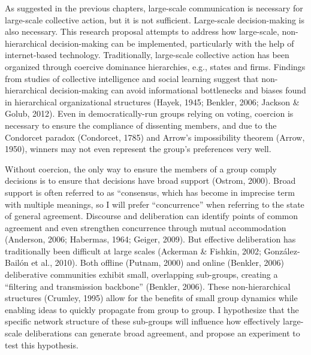 As suggested in the previous chapters, large-scale communication is necessary for large-scale collective action, but it is not sufficient. Large-scale decision-making is also necessary. This research proposal attempts to address how large-scale, non-hierarchical decision-making can be implemented, particularly with the help of internet-based technology. Traditionally, large-scale collective action has been organized through coercive dominance hierarchies, e.g., states and firms. Findings from studies of collective intelligence and social learning suggest that non-hierarchical decision-making can avoid informational bottlenecks and biases found in hierarchical organizational structures (Hayek, 1945; Benkler, 2006; Jackson \& Golub, 2012). Even in democratically-run groups relying on voting, coercion is necessary to ensure the compliance of dissenting members, and due to the Condorcet paradox (Condorcet, 1785) and Arrow’s impossibility theorem (Arrow, 1950), winners may not even represent the group’s preferences very well.

Without coercion, the only way to ensure the members of a group comply decisions is to ensure that decisions have broad support (Ostrom, 2000). Broad support is often referred to as ``consensus, which has become in imprecise term with multiple meanings, so I will prefer ``concurrence'' when referring to the state of general agreement. Discourse and deliberation can identify points of common agreement and even strengthen concurrence through mutual accommodation (Anderson, 2006; Habermas, 1964; Geiger, 2009). But effective deliberation has traditionally been difficult at large scales (Ackerman \& Fishkin, 2002; Gonz\'alez-Bail\'on et al., 2010). Both offline (Putnam, 2000) and online (Benkler, 2006) deliberative communities exhibit small, overlapping sub-groups, creating a ``filtering and transmission backbone'' (Benkler, 2006). These non-hierarchical structures (Crumley, 1995) allow for the benefits of small group dynamics while enabling ideas to quickly propagate from group to group. I hypothesize that the specific network structure of these sub-groups will influence how effectively large-scale deliberations can generate broad agreement, and propose an experiment to test this hypothesis.

